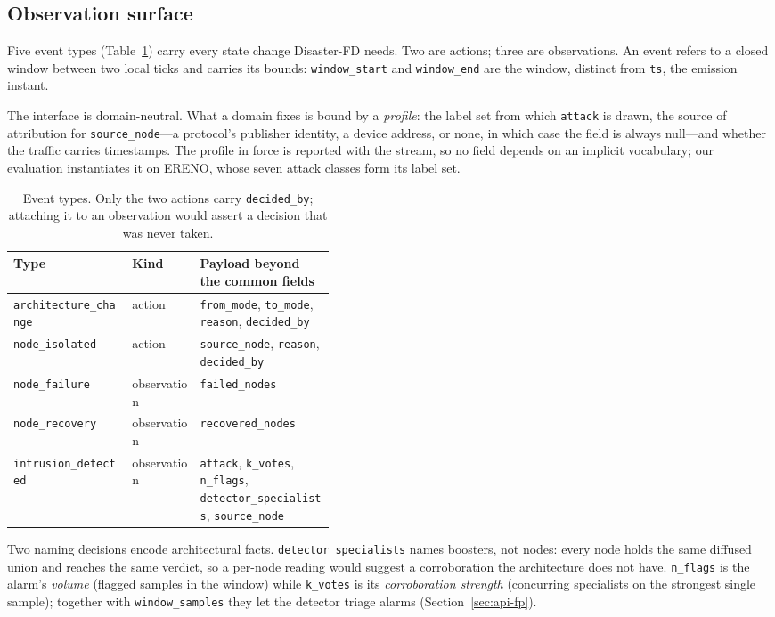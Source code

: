 \subsection{Observation surface}
\label{sec:api-events}

Five event types (Table~\ref{tab:events}) carry every state change Disaster-FD needs. Two
are actions; three are observations. An event refers to a closed window between two local
ticks and carries its bounds: \texttt{window\_start} and \texttt{window\_end} are the
window, distinct from \texttt{ts}, the emission instant.

The interface is domain-neutral. What a domain fixes is bound by a \emph{profile}: the label
set from which \texttt{attack} is drawn, the source of attribution for
\texttt{source\_node}---a protocol's publisher identity, a device address, or none, in which
case the field is always null---and whether the traffic carries timestamps. The profile in
force is reported with the stream, so no field depends on an implicit vocabulary; our
evaluation instantiates it on ERENO, whose seven attack classes form its label set.

\begin{table}[htbp]
\centering
\caption{Event types. Only the two actions carry \texttt{decided\_by}; attaching it to an
observation would assert a decision that was never taken.}
\label{tab:events}
\begin{tabular}{@{}llp{0.42\linewidth}@{}}
\toprule
Type & Kind & Payload beyond the common fields \\
\midrule
\texttt{architecture\_change} & action & \texttt{from\_mode}, \texttt{to\_mode}, \texttt{reason}, \texttt{decided\_by} \\
\texttt{node\_isolated} & action & \texttt{source\_node}, \texttt{reason}, \texttt{decided\_by} \\
\texttt{node\_failure} & observation & \texttt{failed\_nodes} \\
\texttt{node\_recovery} & observation & \texttt{recovered\_nodes} \\
\texttt{intrusion\_detected} & observation & \texttt{attack}, \texttt{k\_votes}, \texttt{n\_flags}, \texttt{detector\_specialists}, \texttt{source\_node} \\
\bottomrule
\end{tabular}
\end{table}

Two naming decisions encode architectural facts. \texttt{detector\_specialists} names
boosters, not nodes: every node holds the same diffused union and reaches the same verdict,
so a per-node reading would suggest a corroboration the architecture does not have.
\texttt{n\_flags} is the alarm's \emph{volume} (flagged samples in the window) while
\texttt{k\_votes} is its \emph{corroboration strength} (concurring specialists on the
strongest single sample); together with \texttt{window\_samples} they let the detector
triage alarms (Section~\ref{sec:api-fp}).

